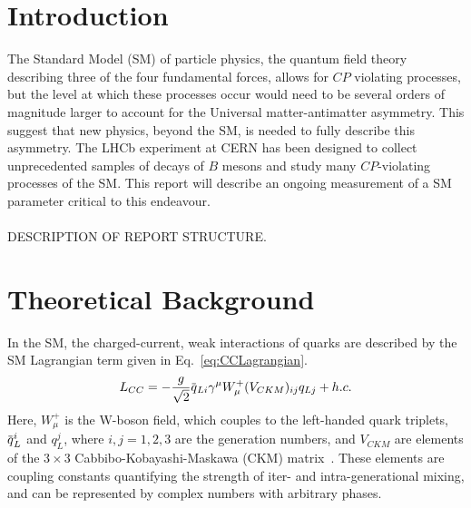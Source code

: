 \documentclass[oneside,12pt]{article}
\newcommand{\overbar}[1]{\mkern 1.5mu\overline{\mkern-1.5mu#1\mkern-1.5mu}\mkern
1.5mu}
\begin{document}
\section{\normalsize Introduction}
The Standard Model (SM) of particle physics, the quantum field theory describing
three of the four fundamental forces, allows for $CP$ violating processes, but the
level at which these processes occur would need to be several orders of
magnitude larger to account for the Universal matter-antimatter asymmetry. This
suggest that new physics, beyond the SM, is needed to fully describe this
asymmetry. The LHCb experiment at CERN has been designed to collect
unprecedented samples of decays of $B$ mesons and study many $CP$-violating
processes of the SM. This report will describe an ongoing measurement of a SM
parameter critical to this endeavour. \\ 
\\
DESCRIPTION OF REPORT STRUCTURE.
\section{\normalsize Theoretical Background}
In the SM, the charged-current, weak interactions of quarks are described by the
SM Lagrangian term given in Eq.~\eqref{eq:CCLagrangian}.
\begin{equation}
  L_{CC}=-\frac{g}{\sqrt{2}}\overbar{q}_{Li}\gamma^{\mu}W_{\mu}^{+}(V_{CKM})_{ij}q_{Lj}
  + h.c.  
  \label{eq:CCLagrangian}
\end{equation}
\noindent Here, $W_{\mu}^{+}$ is the W-boson field, which couples to the
left-handed quark triplets, $\overbar{q}_{L}^{i}$ and $q_{L}^{j}$, where
$i,j=1,2,3$ are the generation numbers, and $V_{CKM}$ are elements of the
$3\times 3$ Cabbibo-Kobayashi-Maskawa (CKM) matrix~\cite{CKMTheory}. These
elements are coupling constants quantifying the strength of iter- and
intra-generational mixing, and can be represented by complex numbers with arbitrary phases.
\end{document}
